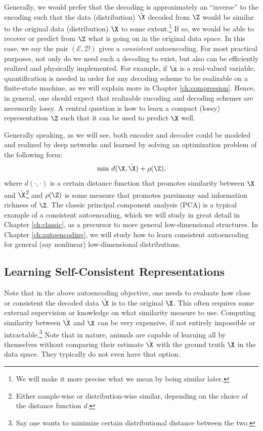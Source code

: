 \documentclass[../../book-main.tex]{subfiles}
\begin{document}
Generally, we would prefer that the decoding is approximately an ``inverse'' to the encoding such that the data (distribution) $\hat \X$ decoded from $\Z$ would be similar to the original data (distribution) $\X$ to some extent.\footnote{We will make it more precise what we mean by being similar later.} If so, we would be able to recover or predict from $\Z$ what is going on in the original data space. In this case, we say the pair $(\mathcal{E}, \mathcal{D})$ gives a {\em consistent}  autoencoding. For most practical purposes, not only do we need such a decoding to exist, but also can be efficiently realized and physically implemented. For example, if $\x$ is a real-valued variable, quantification is needed in order for any decoding scheme to be realizable on a finite-state machine, as we will explain more in Chapter \ref{ch:compression}. Hence, in general, one should expect that realizable encoding and decoding schemes are necessarily lossy. A central question is how to learn a compact (lossy) representation $\Z$ such that it can be used to predict $\X$ well.

Generally speaking, as we will see, both encoder and decoder could be modeled and realized by deep networks and learned by solving an optimization problem of the following form:
\begin{equation}
   \min \, d( \X, \hat \X) + \rho(\Z), 
   \label{eqn:auto-encoding-objective}
\end{equation}
where $d(\cdot, \cdot)$ is a certain distance function that promotes similarity between $\X$ and $\hat \X$\footnote{Either sample-wise or distribution-wise similar, depending on the choice of the distance function $d$.} and $\rho(\Z)$ is some measure that promotes parsimony and information richness of $\Z$. The classic principal component analysis (PCA) \cite{JolliffeI2002} is a typical example of a consistent autoencoding, which we will study in great detail in Chapter \ref{ch:classic}, as a precursor to more general low-dimensional structures. In Chapter \ref{ch:autoencoding}, we will study how to learn consistent autoencoding for general (say nonlinear) low-dimensional distributions.  


\subsection{Learning Self-Consistent Representations}
Note that in the above autoencoding objective, one needs to evaluate how close or consistent the decoded data $\hat \X$ is to the original $\X$. This often requires some external supervision or knowledge on what similarity measure to use. Computing similarity between $\hat \X$ and $\X$ can be very expensive, if not entirely impossible or intractable.\footnote{Say one wants to minimize certain distributional distance between the two.} Note that in nature, animals are capable of learning all by themselves without comparing their estimate $\hat \X$ with the ground truth $\X$ in the data space. They typically do not even have that option. 
\end{document}
